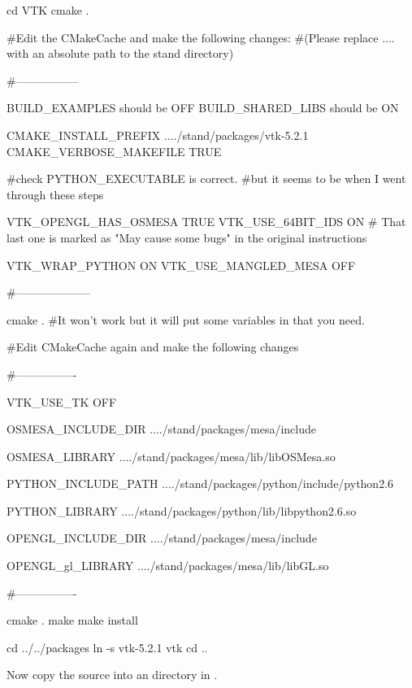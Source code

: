 \begin{shellCode}
cd VTK
cmake .

#Edit the CMakeCache and make the following changes: 
#(Please replace .... with an absolute path to the stand directory)

#-----------------

BUILD_EXAMPLES should be OFF
BUILD_SHARED_LIBS should be ON

CMAKE_INSTALL_PREFIX	..../stand/packages/vtk-5.2.1
CMAKE_VERBOSE_MAKEFILE	TRUE

#check PYTHON_EXECUTABLE is correct.
#but it seems to be when I went through these steps

VTK_OPENGL_HAS_OSMESA	TRUE
VTK_USE_64BIT_IDS	ON
# That last one is marked as "May cause some bugs" in the original instructions

VTK_WRAP_PYTHON	ON
VTK_USE_MANGLED_MESA	OFF

#--------------------

cmake .
#It won't work but it will put some variables in that you need.

#Edit CMakeCache again and make the following changes

#----------------

VTK_USE_TK	OFF

OSMESA_INCLUDE_DIR	..../stand/packages/mesa/include

OSMESA_LIBRARY	..../stand/packages/mesa/lib/libOSMesa.so

PYTHON_INCLUDE_PATH	..../stand/packages/python/include/python2.6

PYTHON_LIBRARY	..../stand/packages/python/lib/libpython2.6.so

OPENGL_INCLUDE_DIR	..../stand/packages/mesa/include

OPENGL_gl_LIBRARY	..../stand/packages/mesa/lib/libGL.so

#----------------

cmake .
make
make install


cd ../../packages
ln -s vtk-5.2.1 vtk
cd ..
\end{shellCode}

Now copy the \esfinley source into an  directory in .

